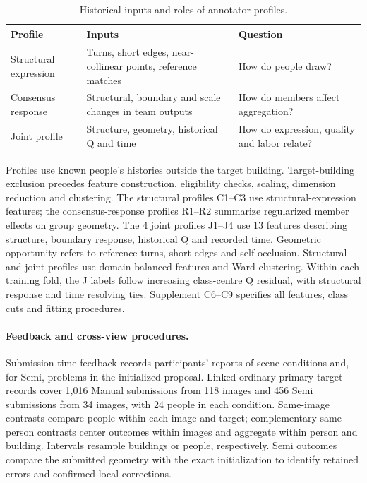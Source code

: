 \begin{table}[!ht]
\centering\small
\caption{Historical inputs and roles of annotator profiles.}
\label{tab:annotator-profiles}
\setlength{\tabcolsep}{3pt}\renewcommand{\arraystretch}{1.14}
\begin{tabular}{@{}>{\raggedright\arraybackslash}p{.22\linewidth}>{\raggedright\arraybackslash}p{.38\linewidth}>{\raggedright\arraybackslash}p{.33\linewidth}@{}}
\hline
Profile & Inputs & Question\\\hline
Structural expression & Turns, short edges, near-collinear points, reference matches & How do people draw?\\
Consensus response & Structural, boundary and scale changes in team outputs & How do members affect aggregation?\\
Joint profile & Structure, geometry, historical Q and time & How do expression, quality and labor relate?\\\hline
\end{tabular}
\end{table}

Profiles use known people's histories outside the target building. Target-building exclusion precedes feature construction, eligibility checks, scaling, dimension reduction and clustering. The structural profiles C1--C3 use structural-expression features; the consensus-response profiles R1--R2 summarize regularized member effects on group geometry. The 4 joint profiles J1--J4 use 13 features describing structure, boundary response, historical Q and recorded time. Geometric opportunity refers to reference turns, short edges and self-occlusion. Structural and joint profiles use domain-balanced features and Ward clustering. Within each training fold, the J labels follow increasing class-centre Q residual, with structural response and time resolving ties. Supplement C6--C9 specifies all features, class cuts and fitting procedures.



\paragraph{Feedback and cross-view procedures.}

Submission-time feedback records participants' reports of scene conditions and, for Semi, problems in the initialized proposal. Linked ordinary primary-target records cover 1,016 Manual submissions from 118 images and 456 Semi submissions from 34 images, with 24 people in each condition. Same-image contrasts compare people within each image and target; complementary same-person contrasts center outcomes within images and aggregate within person and building. Intervals resample buildings or people, respectively. Semi outcomes compare the submitted geometry with the exact initialization to identify retained errors and confirmed local corrections.

